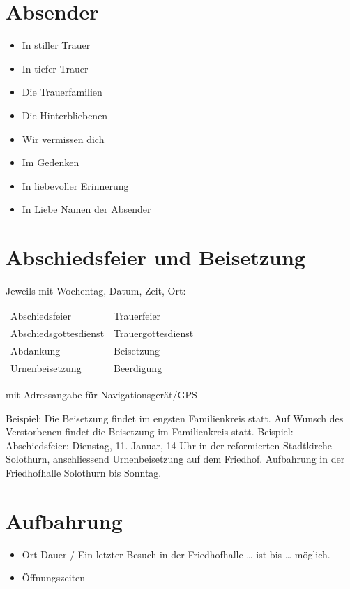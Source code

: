 \documentclass[ngerman,a4paper,11pt]{scrreprt}
\begin{document}
\section{Absender}
\label{sec-1-1-8}

\begin{itemize}
\item In stiller Trauer
\item In tiefer Trauer
\item Die Trauerfamilien
\item Die Hinterbliebenen
\item Wir vermissen dich
\item Im Gedenken
\item In liebevoller Erinnerung
\item In Liebe Namen der Absender
\end{itemize}

\section{Abschiedsfeier und Beisetzung}
\label{sec-1-1-9}

Jeweils mit Wochentag, Datum, Zeit, Ort:

\begin{center}
\begin{tabular}{ll}
Abschiedsfeier & Trauerfeier\\
Abschiedsgottesdienst & Trauergottesdienst\\
Abdankung & Beisetzung\\
Urnenbeisetzung & Beerdigung\\
\end{tabular}
\end{center}

mit Adressangabe für Navigationsgerät/GPS

Beispiel: Die Beisetzung findet im engsten Familienkreis statt. Auf
Wunsch des Verstorbenen findet die Beisetzung im Familienkreis
statt. Beispiel: Abschiedsfeier: Dienstag, 11. Januar, 14 Uhr in der
reformierten Stadtkirche Solothurn, anschliessend Urnenbeisetzung auf
dem Friedhof. Aufbahrung in der Friedhofhalle Solothurn bis Sonntag.

\section{Aufbahrung}
\label{sec-1-1-10}

\begin{itemize}
\item Ort Dauer / Ein letzter Besuch in der Friedhofhalle \ldots{} ist bis
\ldots{} möglich.
\item Öffnungszeiten
\end{itemize}
\end{document}
